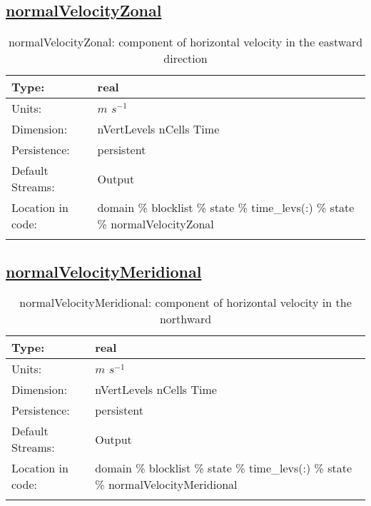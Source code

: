 \subsection[normalVelocityZonal]{\hyperref[sec:var_tab_state]{normalVelocityZonal}}
\label{subsec:var_sec_state_normalVelocityZonal}
\begin{center}
\begin{longtable}{| p{2.0in} | p{4.0in} |}
        \hline 
        Type: & real \\
        \hline 
        Units: & $m$ $s^{-1}$ \\
        \hline 
        Dimension: & nVertLevels nCells Time \\
        \hline 
        Persistence: & persistent \\
        \hline 
		 Default Streams: & Output  \\
        \hline 
		 Location in code: & domain \% blocklist \% state \% time\_levs(:) \% state \% normalVelocityZonal \\
		 \hline 
    \caption{normalVelocityZonal: component of horizontal velocity in the eastward direction}
\end{longtable}
\end{center}
\subsection[normalVelocityMeridional]{\hyperref[sec:var_tab_state]{normalVelocityMeridional}}
\label{subsec:var_sec_state_normalVelocityMeridional}
\begin{center}
\begin{longtable}{| p{2.0in} | p{4.0in} |}
        \hline 
        Type: & real \\
        \hline 
        Units: & $m$ $s^{-1}$ \\
        \hline 
        Dimension: & nVertLevels nCells Time \\
        \hline 
        Persistence: & persistent \\
        \hline 
		 Default Streams: & Output  \\
        \hline 
		 Location in code: & domain \% blocklist \% state \% time\_levs(:) \% state \% normalVelocityMeridional \\
		 \hline 
    \caption{normalVelocityMeridional: component of horizontal velocity in the northward}
\end{longtable}
\end{center}
